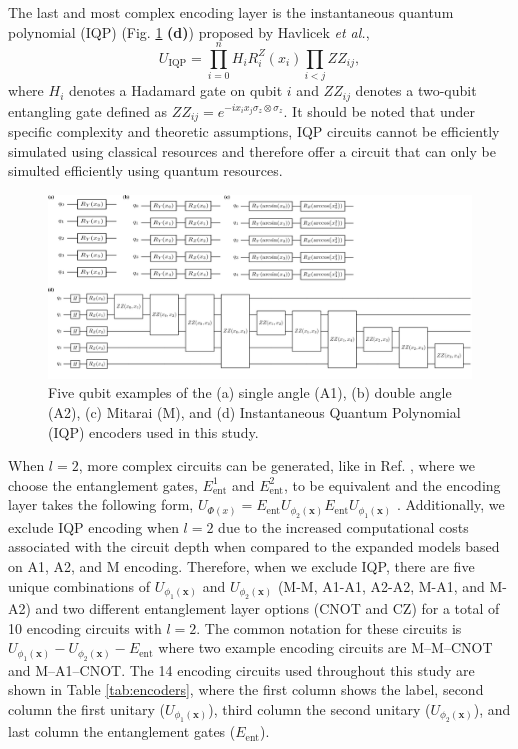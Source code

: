 \documentclass[journal=jacsat,manuscript=article]{achemso}
\begin{document}
The last and most complex encoding layer is the instantaneous quantum polynomial (IQP) (Fig. \ref{fig:encoders} \textbf{(d)}) proposed by Havlicek \textit{et al.}\cite{havlicek_supervised_2019},
\begin{equation}
	U_{\text{IQP}}  = \prod_{i=0}^{n} H_{i} R^{Z}_{i}(x_{i})  \prod_{i<j} ZZ_{ij},
	\label{eq:IQP}
\end{equation}
where $H_{i}$ denotes a Hadamard gate on qubit $i$ and $ZZ_{ij}$ denotes a two-qubit entangling gate defined as $ZZ_{ij} = e^{-i x_{i} x_{j} \sigma_{z} \otimes \sigma_{z}}$.
It should be noted that under specific complexity and theoretic assumptions, IQP circuits cannot be efficiently simulated using classical resources and therefore offer a circuit that can only be simulted efficiently using quantum resources.\cite{lund_quantum_2017,harrow_quantum_2017}

  


  
\begin{figure}[H]
	\centering
	\includegraphics[width=\textwidth]{../images/encoders/quantikz/combined.png}
	\caption{Five qubit examples of the (a) single angle (A1), (b) double angle (A2), (c) Mitarai (M), and (d) Instantaneous Quantum Polynomial (IQP) encoders used in this study.}
	\label{fig:encoders}
\end{figure}

When $l=2$, more complex circuits can be generated, like in Ref. \citep{suzuki_predicting_2020}, where we choose the entanglement gates, $E_{\text{ent}}^{1}$ and $E_{\text{ent}}^{2}$, to be equivalent and the encoding layer takes the following form, $U_{\Phi(x)} =  E_{\text{ent}} U_{\phi_{2}(\mathbf{x})} E_{\text{ent}} U_{\phi_{1}(\mathbf{x})}$ .
Additionally, we exclude IQP encoding when $l=2$ due to the increased computational costs associated with the circuit depth when compared to the expanded models based on A1, A2, and M encoding.
Therefore, when we exclude IQP, there are five unique combinations of $U_{\phi_{1}(\mathbf{x})}$ and $U_{\phi_{2}(\mathbf{x})}$ (M-M, A1-A1, A2-A2, M-A1, and M-A2) and two different entanglement layer options (CNOT and CZ) for a total of 10 encoding circuits with $l=2$.
The common notation for these circuits is $U_{\phi_{1}(\mathbf{x})}-U_{\phi_{2}(\mathbf{x})}-E_{\text{ent}}$ where two example encoding circuits are M--M--CNOT and M--A1--CNOT.
The 14 encoding circuits used throughout this study are shown in Table \ref{tab:encoders}, where the first column shows the label, second column the first unitary ($U_{\phi_{1}(\mathbf{x})}$), third column the second unitary ($U_{\phi_{2}(\mathbf{x})}$), and last column the entanglement gates ($E_{\text{ent}}$).
\end{document}
